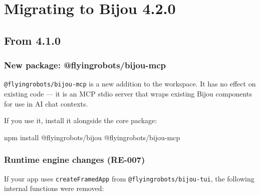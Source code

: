 \chapter{Migrating to Bijou 4.2.0}\label{record-265}

\smallskip

\section{From 4.1.0}\label{record-265-from-4.1.0}

\subsection{New package: @flyingrobots/bijou-mcp}\label{record-265-new-package-flyingrobotsbijou-mcp}

\texttt{@\allowbreak{}f\allowbreak{}l\allowbreak{}y\allowbreak{}i\allowbreak{}n\allowbreak{}g\allowbreak{}r\allowbreak{}o\allowbreak{}b\allowbreak{}o\allowbreak{}t\allowbreak{}s\allowbreak{}/\allowbreak{}b\allowbreak{}i\allowbreak{}j\allowbreak{}o\allowbreak{}u\allowbreak{}-\allowbreak{}m\allowbreak{}c\allowbreak{}p} is a new addition to the workspace. It has no effect on existing code --- it is an MCP stdio server that wraps existing Bijou components for use in AI chat contexts.

If you use it, install it alongside the core package:

\begin{CodeBlock}
npm install @flyingrobots/bijou @flyingrobots/bijou-mcp
\end{CodeBlock}

\subsection{Runtime engine changes (RE-007)}\label{record-265-runtime-engine-changes-re-007}

If your app uses \texttt{c\allowbreak{}r\allowbreak{}e\allowbreak{}a\allowbreak{}t\allowbreak{}e\allowbreak{}F\allowbreak{}r\allowbreak{}a\allowbreak{}m\allowbreak{}e\allowbreak{}d\allowbreak{}A\allowbreak{}p\allowbreak{}p} from \texttt{@\allowbreak{}f\allowbreak{}l\allowbreak{}y\allowbreak{}i\allowbreak{}n\allowbreak{}g\allowbreak{}r\allowbreak{}o\allowbreak{}b\allowbreak{}o\allowbreak{}t\allowbreak{}s\allowbreak{}/\allowbreak{}b\allowbreak{}i\allowbreak{}j\allowbreak{}o\allowbreak{}u\allowbreak{}-\allowbreak{}t\allowbreak{}u\allowbreak{}i}, the following internal functions were removed:

